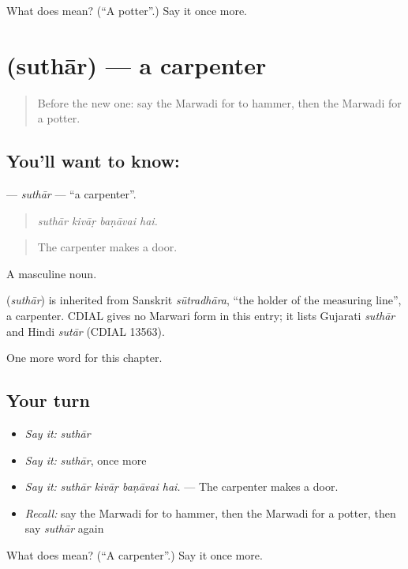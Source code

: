 \begin{tcolorbox}[breakable,colback=teal!4,colframe=teal!35!black,title={Before you move on}]
What does  mean? (\textquotedblleft{}A potter\textquotedblright{}.) Say it once more.
\end{tcolorbox}
\section[\texorpdfstring{\mw{सुथार} (suthār)}{सुथार (suthār)}]{ (suthār) — a carpenter}

\label{lesson:MW-C264-suthar}



\begin{quote}
Before the new one: say the Marwadi for to hammer, then the Marwadi for a potter.
\end{quote}

\subsection*{You'll want to know: }
\textbf{} — \emph{suthār} — \textquotedblleft{}a carpenter\textquotedblright{}.

\begin{quote}
   
\end{quote}

\begin{quote}
\emph{suthār kivāṛ baṇāvai hai.}
\end{quote}

\begin{quote}
The carpenter makes a door.
\end{quote}

A masculine noun.

\begin{cousinweb}
\textbf{} (\emph{suthār}) is inherited from Sanskrit \emph{sūtradhāra}, \textquotedblleft{}the holder of the measuring line\textquotedblright{}, a carpenter. CDIAL gives no Marwari form in this entry; it lists Gujarati \emph{suthār} and Hindi \emph{sutār} (CDIAL 13563).
\end{cousinweb}

\begin{grammarlens}[title={What you've built}]
One more word for this chapter.
\end{grammarlens}

\subsection*{Your turn}
\begin{itemize}
\raggedright
  \item \emph{Say it:} \emph{suthār}
  \item \emph{Say it:} \emph{suthār}, once more
  \item \emph{Say it:} \emph{suthār kivāṛ baṇāvai hai.} — The carpenter makes a door.
  \item \emph{Recall:} say the Marwadi for to hammer, then the Marwadi for a potter, then say \emph{suthār} again
\end{itemize}

\begin{tcolorbox}[breakable,colback=teal!4,colframe=teal!35!black,title={Before you move on}]
What does  mean? (\textquotedblleft{}A carpenter\textquotedblright{}.) Say it once more.
\end{tcolorbox}
